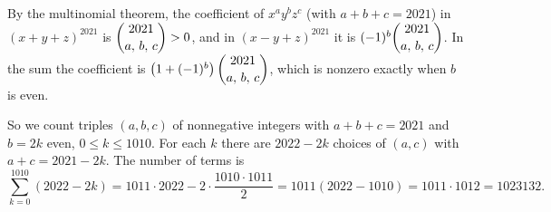 By the multinomial theorem, the coefficient of $x^ay^bz^c$ (with $a+b+c=2021$) in $(x+y+z)^{2021}$ is $\dbinom{2021}{a,\,b,\,c}>0$, and in $(x-y+z)^{2021}$ it is $(-1)^b\dbinom{2021}{a,\,b,\,c}$. In the sum the coefficient is $\left(1+(-1)^b\right)\dbinom{2021}{a,\,b,\,c}$, which is nonzero exactly when $b$ is even.

So we count triples $(a,b,c)$ of nonnegative integers with $a+b+c=2021$ and $b=2k$ even, $0\le k\le1010$. For each $k$ there are $2022-2k$ choices of $(a,c)$ with $a+c=2021-2k$. The number of terms is
\[\sum_{k=0}^{1010}(2022-2k)=1011\cdot2022-2\cdot\dfrac{1010\cdot1011}{2}=1011(2022-1010)=1011\cdot1012=\boxed{1023132}.\]
